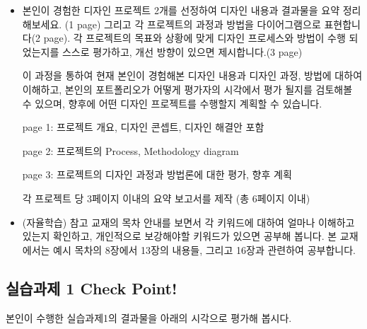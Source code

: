 \documentclass[
  letterpaper,
]{book}
\begin{document}
\begin{itemize}
\item
  본인이 경험한 디자인 프로젝트 2개를 선정하여 디자인 내용과 결과물을
  요약 정리해보세요. (1 page) 그리고 각 프로젝트의 과정과 방법을
  다이어그램으로 표현합니다(2 page). 각 프로젝트의 목표와 상황에 맞게
  디자인 프로세스와 방법이 수행 되었는지를 스스로 평가하고, 개선 방향이
  있으면 제시합니다.(3 page)

  이 과정을 통하여 현재 본인이 경험해본 디자인 내용과 디자인 과정,
  방법에 대하여 이해하고, 본인의 포트폴리오가 어떻게 평가자의 시각에서
  평가 될지를 검토해볼 수 있으며, 향후에 어떤 디자인 프로젝트를 수행할지
  계획할 수 있습니다.

  page 1: 프로젝트 개요, 디자인 콘셉트, 디자인 해결안 포함

  page 2: 프로젝트의 Process, Methodology diagram

  page 3: 프로젝트의 디자인 과정과 방법론에 대한 평가, 향후 계획

  각 프로젝트 당 3페이지 이내의 요약 보고서를 제작 (총 6페이지 이내)
\item
  (자율학습) 참고 교재의 목차 안내를 보면서 각 키워드에 대하여 얼마나
  이해하고 있는지 확인하고, 개인적으로 보강해야할 키워드가 있으면 공부해
  봅니다. 본 교재에서는 예시 목차의 8장에서 13장의 내용들, 그리고 16장과
  관련하여 공부합니다.
\end{itemize}

\subsection{실습과제 1 Check
Point!}\label{uxc2e4uxc2b5uxacfcuxc81c-1-check-point}

본인이 수행한 실습과제1의 결과물을 아래의 시각으로 평가해 봅시다.
\end{document}
